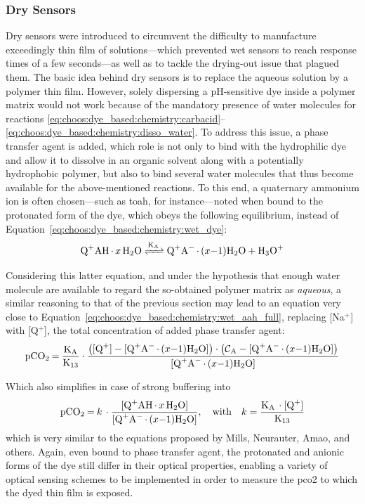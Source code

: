 \subsubsection{Dry Sensors}

Dry sensors were introduced to circumvent the difficulty to manufacture exceedingly thin film of solutions---which prevented wet sensors to reach response times of a few seconds---as well as to tackle the drying-out issue that plagued them\cite{wolfbeis2005, mills2009}. The basic idea behind dry sensors is to replace the aqueous solution by a polymer thin film. However, solely dispersing a pH-sensitive dye inside a polymer matrix would not work because of the mandatory presence of water molecules for reactions \ref{eq:choos:dye_based:chemistry:carbacid}--\ref{eq:choos:dye_based:chemistry:disso_water}. To address this issue, a phase transfer agent is added, which role is not only to bind with the hydrophilic dye and allow it to dissolve in an organic solvent along with a potentially hydrophobic polymer, but also to bind several water molecules that thus become available for the above-mentioned reactions\cite{mills2009}. To this end, a quaternary ammonium ion is often chosen---such as \gls{toah}, for instance\cite{amao2004}---noted  when bound to the protonated form of the dye, which obeys the following equilibrium, instead of Equation~\ref{eq:choos:dye_based:chemistry:wet_dye}:
\begin{equation}
	\ce{Q^+AH.$x$H_2O <=>[K_A] Q^+A^-.$(x-1)$H_2O + H_3O^+}
\end{equation}

Considering this latter equation, and under the hypothesis that enough water molecule are available to regard the so-obtained polymer matrix as \emph{aqueous}, a similar reasoning to that of the previous section may lead to an equation very close to Equation~\ref{eq:choos:dye_based:chemistry:wet_aah_full}, replacing [Na$^+$] with [Q$^+$], the total concentration of added phase transfer agent:
\begin{equation}\label{eq:choos:dye_based:chemistry:dry_aah_unbuff}
	\ce{pCO_2 = \frac{K_A}{K_{13}}}\cdot \frac{\left(\ce{[Q^+] - [Q^+A^-.$(x-1)$H_2O]}\right)\cdot\left(\ce{\mathcal{C}_A - [Q^+A^-.$(x-1)$H_2O]}\right)}{\ce{[Q^+A^-.$(x-1)$H_2O]}}
\end{equation}

Which also simplifies in case of strong buffering into
\begin{equation}\label{eq:choos:dye_based:chemistry:dry_aah_buff}
	\ce{pCO_2 = $k$ \cdot \frac{[Q^+AH.$x$H_2O]}{[Q^+A^-.$(x-1)$H_2O]}} , \quad \text{with} \quad k = \ce{\frac{K_A \cdot [Q^+]}{K_{13}}}
\end{equation}
which is very similar to the equations proposed by Mills, Neurauter, Amao, and others\cite{mills1992, neurauter1999, amao2005b}. Again, even bound to phase transfer agent, the protonated and anionic forms of the dye still differ in their optical properties, enabling a variety of optical sensing schemes to be implemented in order to measure the \gls{pco2} to which the dyed thin film is exposed.

